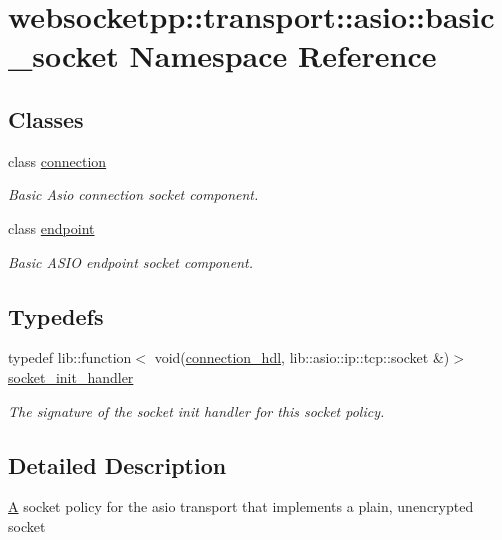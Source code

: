 \hypertarget{namespacewebsocketpp_1_1transport_1_1asio_1_1basic__socket}{}\section{websocketpp\+:\+:transport\+:\+:asio\+:\+:basic\+\_\+socket Namespace Reference}
\label{namespacewebsocketpp_1_1transport_1_1asio_1_1basic__socket}
\subsection*{Classes}
\begin{DoxyCompactItemize}
\item 
class \mbox{\hyperlink{classwebsocketpp_1_1transport_1_1asio_1_1basic__socket_1_1connection}{connection}}
\begin{DoxyCompactList}\small\item\em Basic Asio connection socket component. \end{DoxyCompactList}\item 
class \mbox{\hyperlink{classwebsocketpp_1_1transport_1_1asio_1_1basic__socket_1_1endpoint}{endpoint}}
\begin{DoxyCompactList}\small\item\em Basic A\+S\+IO endpoint socket component. \end{DoxyCompactList}\end{DoxyCompactItemize}
\subsection*{Typedefs}
\begin{DoxyCompactItemize}
\item 
\mbox{\label{namespacewebsocketpp_1_1transport_1_1asio_1_1basic__socket_a88f9c59fa40db3188769162db98edb93}} 
typedef lib\+::function$<$ void(\mbox{\hyperlink{namespacewebsocketpp_a6b3d26a10ee7229b84b776786332631d}{connection\+\_\+hdl}}, lib\+::asio\+::ip\+::tcp\+::socket \&)$>$ \mbox{\hyperlink{namespacewebsocketpp_1_1transport_1_1asio_1_1basic__socket_a88f9c59fa40db3188769162db98edb93}{socket\+\_\+init\+\_\+handler}}
\begin{DoxyCompactList}\small\item\em The signature of the socket init handler for this socket policy. \end{DoxyCompactList}\end{DoxyCompactItemize}


\subsection{Detailed Description}
\mbox{\hyperlink{struct_a}{A}} socket policy for the asio transport that implements a plain, unencrypted socket 